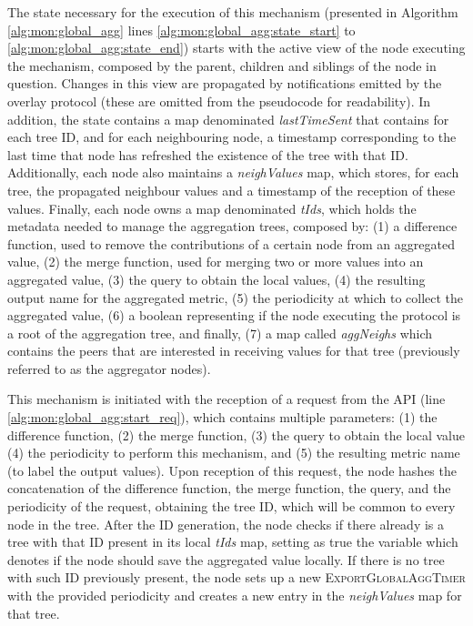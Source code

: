 

The state necessary for the execution of this mechanism (presented in Algorithm \ref{alg:mon:global_agg} lines \ref{alg:mon:global_agg:state_start} to \ref{alg:mon:global_agg:state_end}) starts with the active view of the node executing the mechanism, composed by the parent, children and siblings of the node in question. Changes in this view are propagated by notifications emitted by the overlay protocol (these are omitted from the pseudocode for readability). In addition, the state contains a map denominated \textit{lastTimeSent} that contains for each tree ID, and for each neighbouring node, a timestamp corresponding to the last time that node has refreshed the existence of the tree with that ID. Additionally, each node also maintains a \textit{neighValues} map, which stores, for each tree, the propagated neighbour values and a timestamp of the reception of these values. Finally, each node owns a map denominated \textit{tIds},  which holds the metadata needed to manage the aggregation trees, composed by: (1) a difference function, used to remove the contributions of a certain node from an aggregated value, (2) the merge function, used for merging two or more values into an aggregated value, (3) the query to obtain the local values, (4) the resulting output name for the aggregated metric, (5) the periodicity at which to collect the aggregated value, (6) a boolean representing if the node executing the protocol is a root of the aggregation tree, and finally, (7) a map called \textit{aggNeighs} which contains the peers that are interested in receiving values for that tree (previously referred to as the aggregator nodes).

This mechanism is initiated with the reception of a request from the API (line \ref{alg:mon:global_agg:start_req}), which contains multiple parameters: (1) the difference function, (2) the merge function, (3) the query to obtain the local value (4) the periodicity to perform this mechanism, and (5) the resulting metric name (to label the output values). Upon reception of this request, the node hashes the concatenation of the difference function, the merge function, the query, and the periodicity of the request, obtaining the tree ID, which will be common to every node in the tree. After the ID generation, the node checks if there already is a tree with that ID present in its local \textit{tIds} map, setting as true the variable which denotes if the node should save the aggregated value locally. If there is no tree with such ID previously present, the node sets up a new \textsc{ExportGlobalAggTimer} with the provided periodicity and creates a new entry in the \textit{neighValues} map for that tree.

